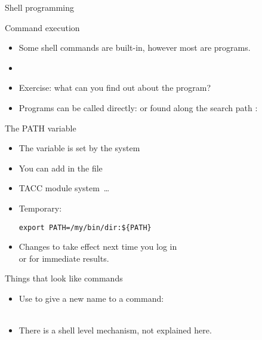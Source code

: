 \documentclass[11pt,headernav]{beamer}
\begin{document}
 {Shell programming}

\begin{numberedframe}{Command execution}
  \label{sl-lnx:execute}
  \begin{itemize}
  \item Some shell commands are built-in, however most are programs.
  \item {}
  \item Exercise: what can you find out about the  program?
  \item Programs can be called directly: 
    or found along the search path :\\
  \end{itemize}
\end{numberedframe}

\begin{numberedframe}{The PATH variable}
  \begin{itemize}
  \item The  variable is set by the system
  \item You can add in the  file
  \item TACC module system~\ldots
  \item Temporary:
\begin{verbatim}
export PATH=/my/bin/dir:${PATH}
\end{verbatim}
\item Changes to  take effect next time you log in\\
  or  for immediate results.
  \end{itemize}
\end{numberedframe}

\begin{numberedframe}{Things that look like commands}
  \label{sl-lnx:alias}
  \begin{itemize}
  \item Use  to give a new name to a command:\\
    \\
  \item There is a shell level  mechanism,
    not explained here.
  \end{itemize}
\end{numberedframe}
\end{document}
